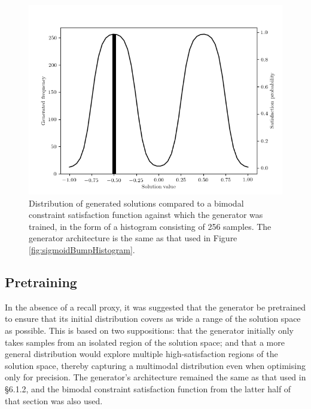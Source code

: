 \documentclass[../../main.tex]{subfiles}
\begin{document}
\begin{figure}[H]
    \begin{center}
    \includegraphics[width=\textwidth]{sigmoidBumpHistogramBimodal}
    \caption{
        Distribution of generated solutions compared to a bimodal constraint satisfaction function against which the generator was trained, in the form of a histogram consisting of 256 samples.
        The generator architecture is the same as that used in Figure \ref{fig:sigmoidBumpHistogram}.
    }
    \label{fig:sigmoidBumpHistogramBimodal}
    \end{center}
\end{figure}

\subsection{Pretraining}

In the absence of a recall proxy, it was suggested that the generator be pretrained to ensure that its initial distribution covers as wide a range of the solution space as possible.
This is based on two suppositions: that the generator initially only takes samples from an isolated region of the solution space; and that a more general distribution would explore multiple high-satisfaction regions of the solution space, thereby capturing a multimodal distribution even when optimising only for precision.
The generator's architecture remained the same as that used in \S6.1.2, and the bimodal constraint satisfaction function from the latter half of that section was also used.
\end{document}
